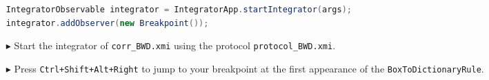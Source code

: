 \begin{enumerate}
\begin{lstlisting}[language=Java,backgroundcolor=\color{white}, keywordstyle={\bfseries\color{purple}}]
IntegratorObservable integrator = IntegratorApp.startIntegrator(args);
integrator.addObserver(new Breakpoint());
\end{lstlisting}

	\item[$\blacktriangleright$] Start the integrator of \texttt{corr\_BWD.xmi} using the protocol \texttt{protocol\_BWD.xmi}.
	\item[$\blacktriangleright$] Press \texttt{Ctrl+Shift+Alt+Right} to jump to your breakpoint at the first appearance of the \texttt{BoxToDictionaryRule}.

\end{enumerate}


